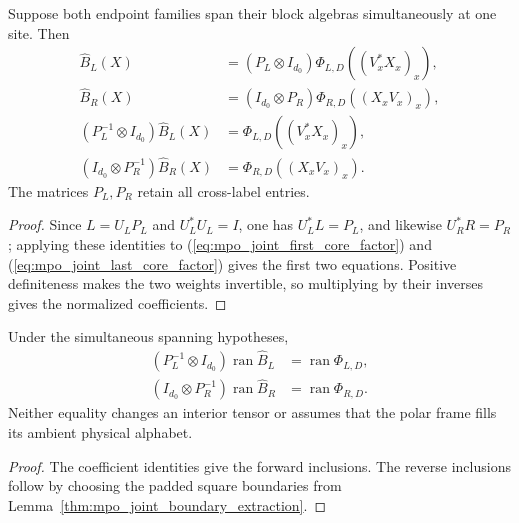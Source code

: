 \begin{lemma}
    \label{thm:mpo_joint_polar_edge_coefficients}
    \leanok
    Suppose both endpoint families span their block algebras simultaneously
    at one site. Then
    \begin{align}
        \widehat B_L(X) & =(P_L\otimes I_{d_0})\Phi_{L,D}((V_x^*X_x)_x), \\
        \widehat B_R(X) & =(I_{d_0}\otimes P_R)\Phi_{R,D}((X_xV_x)_x),   \\
        (P_L^{-1}\otimes I_{d_0})\widehat B_L(X)
                        & =\Phi_{L,D}((V_x^*X_x)_x),                     \\
        (I_{d_0}\otimes P_R^{-1})\widehat B_R(X)
                        & =\Phi_{R,D}((X_xV_x)_x).
    \end{align}
    The matrices $P_L,P_R$ retain all cross-label entries.
\end{lemma}
\begin{proof}
    \leanok
    Since $L=U_LP_L$ and $U_L^*U_L=I$, one has $U_L^*L=P_L$, and
    likewise $U_R^*R=P_R$; applying these identities to
    (\ref{eq:mpo_joint_first_core_factor}) and
    (\ref{eq:mpo_joint_last_core_factor}) gives the first two equations.
    Positive definiteness makes the two weights invertible, so
    multiplying by their inverses gives the normalized coefficients.
\end{proof}

\begin{lemma}
    \label{thm:mpo_joint_normalized_edge_supports}
    \leanok
    Under the simultaneous spanning hypotheses,
    \begin{align}
        (P_L^{-1}\otimes I_{d_0})\operatorname{ran}\widehat B_L
         & =\operatorname{ran}\Phi_{L,D}, \\
        (I_{d_0}\otimes P_R^{-1})\operatorname{ran}\widehat B_R
         & =\operatorname{ran}\Phi_{R,D}.
    \end{align}
    Neither equality changes an interior tensor or assumes that the
    polar frame fills its ambient physical alphabet.
\end{lemma}
\begin{proof}
    \leanok
    The coefficient identities give the forward inclusions.
    The reverse inclusions follow by choosing the padded square
    boundaries from Lemma~\ref{thm:mpo_joint_boundary_extraction}.
\end{proof}

